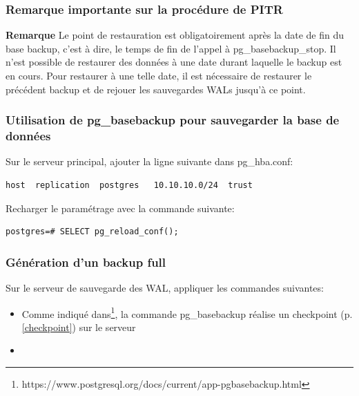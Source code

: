 
\begin{frame}[fragile]\frametitle{Remarque importante sur la procédure de PITR}

\begin{small}
   \textbf{Remarque} Le point de restauration est obligatoirement après la date de fin du base backup, c'est à dire, le temps de fin de l'appel à pg\_basebackup\_stop. Il n'est possible de restaurer des données à une date durant laquelle le backup est en cours.
Pour restaurer à une telle date, il est nécessaire de restaurer le précédent backup et de rejouer les sauvegardes WALs jusqu'à ce point.
\end{small}

\end{frame}


\begin{frame}[fragile]\frametitle{Utilisation de \textsf{pg\_basebackup} pour sauvegarder la base de données}

Sur le serveur principal, ajouter la ligne suivante dans pg\_hba.conf:

\begin{tiny}
\begin{Verbatim}[commandchars=\\\{\}]
host  replication  postgres   10.10.10.0/24  trust
\end{Verbatim}
\end{tiny}

Recharger le paramétrage avec la commande suivante:

\begin{tiny}
\begin{verbatim}
postgres=# SELECT pg_reload_conf();
\end{verbatim}
\end{tiny}

\end{frame}


\begin{frame}[fragile]\frametitle{Génération d'un backup full}

Sur le serveur de sauvegarde des WAL, appliquer les commandes suivantes:

\begin{itemize}
   \item Comme indiqué dans\footnote{https://www.postgresql.org/docs/current/app-pgbasebackup.html}, la commande \textsf{pg\_basebackup} réalise un checkpoint (p. \ref{checkpoint}) sur le serveur
   \item {}
\end{itemize}

\end{frame}


